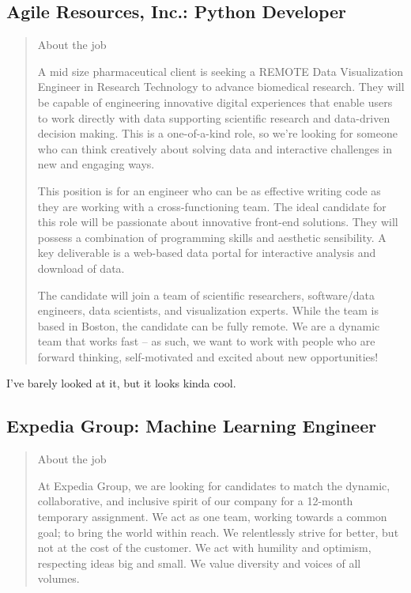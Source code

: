 \documentclass[
	letterpaper, %
	12pt, %
]{CSSullivanBusinessReport}
\begin{document}
\subsection[Agile Resources, Inc.]{Agile Resources, Inc.: Python Developer}

\begin{quote}
	About the job
	
	A mid size pharmaceutical client is seeking a REMOTE Data Visualization Engineer in Research Technology to advance biomedical research. They will be capable of engineering innovative digital experiences that enable users to work directly with data supporting scientific research and data-driven decision making. This is a one-of-a-kind role, so we're looking for someone who can think creatively about solving data and interactive challenges in new and engaging ways.


	This position is for an engineer who can be as effective writing code as they are working with a cross-functioning team. The ideal candidate for this role will be passionate about innovative front-end solutions. They will possess a combination of programming skills and aesthetic sensibility. A key deliverable is a web-based data portal for interactive analysis and download of data.


	The candidate will join a team of scientific researchers, software/data engineers, data scientists, and visualization experts. While the team is based in Boston, the candidate can be fully remote. We are a dynamic team that works fast -- as such, we want to work with people who are forward thinking, self-motivated and excited about new opportunities!
\end{quote}

I've barely looked at it, but it looks kinda cool. 

\subsection[Expedia Group]{Expedia Group: Machine Learning Engineer}

\begin{quote}
	About the job
	
	At Expedia Group, we are looking for candidates to match the dynamic, collaborative, and inclusive spirit of our company for a 12-month temporary assignment. We act as one team, working towards a common goal; to bring the world within reach. We relentlessly strive for better, but not at the cost of the customer. We act with humility and optimism, respecting ideas big and small. We value diversity and voices of all volumes.
\end{quote}
\end{document}
